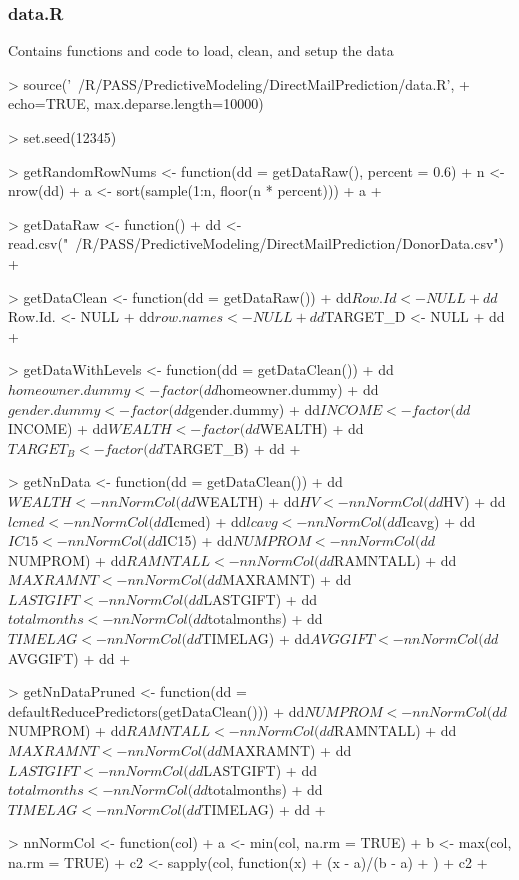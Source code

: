 \documentclass{article}
\begin{document}
\subsubsection*{data.R}
Contains functions and code to load, clean, and setup the data
\begin{Schunk}
\begin{Sinput}
> source('~/R/PASS/PredictiveModeling/DirectMailPrediction/data.R', 
+        echo=TRUE, max.deparse.length=10000)
\end{Sinput}
\begin{Soutput}
> set.seed(12345)

> getRandomRowNums <- function(dd = getDataRaw(), percent = 0.6) {
+     n <- nrow(dd)
+     a <- sort(sample(1:n, floor(n * percent)))
+     a
+ }

> getDataRaw <- function() {
+     dd <- read.csv("~/R/PASS/PredictiveModeling/DirectMailPrediction/DonorData.csv")
+ }

> getDataClean <- function(dd = getDataRaw()) {
+     dd$Row.Id <- NULL
+     dd$Row.Id. <- NULL
+     dd$row.names <- NULL
+     dd$TARGET_D <- NULL
+     dd
+ }

> getDataWithLevels <- function(dd = getDataClean()) {
+     dd$homeowner.dummy <- factor(dd$homeowner.dummy)
+     dd$gender.dummy <- factor(dd$gender.dummy)
+     dd$INCOME <- factor(dd$INCOME)
+     dd$WEALTH <- factor(dd$WEALTH)
+     dd$TARGET_B <- factor(dd$TARGET_B)
+     dd
+ }

> getNnData <- function(dd = getDataClean()) {
+     dd$WEALTH <- nnNormCol(dd$WEALTH)
+     dd$HV <- nnNormCol(dd$HV)
+     dd$lcmed <- nnNormCol(dd$Icmed)
+     dd$lcavg <- nnNormCol(dd$Icavg)
+     dd$IC15 <- nnNormCol(dd$IC15)
+     dd$NUMPROM <- nnNormCol(dd$NUMPROM)
+     dd$RAMNTALL <- nnNormCol(dd$RAMNTALL)
+     dd$MAXRAMNT <- nnNormCol(dd$MAXRAMNT)
+     dd$LASTGIFT <- nnNormCol(dd$LASTGIFT)
+     dd$totalmonths <- nnNormCol(dd$totalmonths)
+     dd$TIMELAG <- nnNormCol(dd$TIMELAG)
+     dd$AVGGIFT <- nnNormCol(dd$AVGGIFT)
+     dd
+ }

> getNnDataPruned <- function(dd = defaultReducePredictors(getDataClean())) {
+     dd$NUMPROM <- nnNormCol(dd$NUMPROM)
+     dd$RAMNTALL <- nnNormCol(dd$RAMNTALL)
+     dd$MAXRAMNT <- nnNormCol(dd$MAXRAMNT)
+     dd$LASTGIFT <- nnNormCol(dd$LASTGIFT)
+     dd$totalmonths <- nnNormCol(dd$totalmonths)
+     dd$TIMELAG <- nnNormCol(dd$TIMELAG)
+     dd
+ }

> nnNormCol <- function(col) {
+     a <- min(col, na.rm = TRUE)
+     b <- max(col, na.rm = TRUE)
+     c2 <- sapply(col, function(x) {
+         (x - a)/(b - a)
+     })
+     c2
+ }


\end{Soutput}
\end{Schunk}
\end{document}
